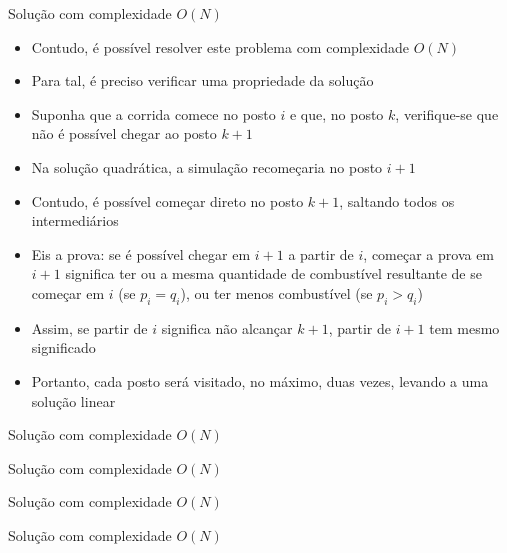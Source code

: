 \begin{frame}[fragile]{Solução com complexidade $O(N)$}

    \begin{itemize}
        \item Contudo, é possível resolver este problema com complexidade $O(N)$

        \item Para tal, é preciso verificar uma propriedade da solução 

        \item Suponha que a corrida comece no posto $i$ e que, no posto $k$, verifique-se que
            não é possível chegar ao posto $k + 1$

        \item Na solução quadrática, a simulação recomeçaria no posto $i + 1$

        \item Contudo, é possível começar direto no posto $k + 1$, saltando todos os intermediários

        \item Eis a prova: se é possível chegar em $i + 1$ a partir de $i$, começar a prova em
            $i + 1$ significa ter ou a mesma quantidade de combustível resultante de se 
            começar em $i$ (se $p_i = q_i$), ou ter menos combustível (se $p_i > q_i$)

        \item Assim, se partir de $i$ significa não alcançar $k + 1$, partir de $i + 1$ tem mesmo
            significado

        \item Portanto, cada posto será visitado, no máximo, duas vezes, levando a uma solução
            linear
    \end{itemize}

\end{frame}

\begin{frame}[fragile]{Solução com complexidade $O(N)$}
\end{frame}

\begin{frame}[fragile]{Solução com complexidade $O(N)$}
\end{frame}

\begin{frame}[fragile]{Solução com complexidade $O(N)$}
\end{frame}

\begin{frame}[fragile]{Solução com complexidade $O(N)$}
\end{frame}

